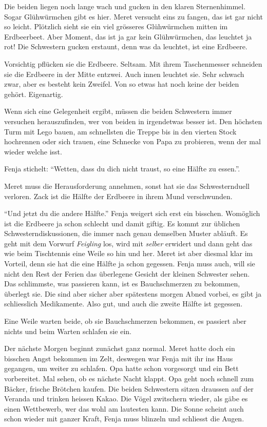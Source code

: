 Die beiden liegen noch lange wach und gucken in den klaren Sternenhimmel. Sogar Glühwürmchen gibt es hier. Meret versucht eins zu fangen, das ist gar nicht so leicht. Plötzlich sieht sie ein viel grösseres Glühwürmchen mitten im Erdbeerbeet. Aber Moment, das ist ja gar kein Glühwürmchen, das leuchtet ja rot! Die Schwestern gucken erstaunt, denn was da leuchtet, ist eine Erdbeere.

Vorsichtig pflücken sie die Erdbeere. Seltsam. Mit ihrem Taschenmesser schneiden sie die Erdbeere in der Mitte entzwei. Auch innen leuchtet sie. Sehr schwach zwar, aber es besteht kein Zweifel. Von so etwas hat noch keine der beiden gehört. Eigenartig. 

Wenn sich eine Gelegenheit ergibt, müssen die beiden Schwestern immer versuchen herauszufinden, wer von beiden in irgendetwas besser ist. Den höchsten Turm mit Lego bauen, am schnellsten die Treppe bis in den vierten Stock hochrennen oder sich trauen, eine Schnecke von Papa zu probieren, wenn der mal wieder welche isst. 

Fenja stichelt: \enquote{Wetten, dass du dich nicht traust, so eine Hälfte zu essen.}. 

Meret muss die Herausforderung annehmen, sonst hat sie das Schwesternduell verloren. Zack ist die Hälfte der Erdbeere in ihrem Mund verschwunden.

\enquote{Und jetzt du die andere Hälfte.} Fenja weigert sich erst ein bisschen. Womöglich ist die Erdbeere ja schon schlecht und damit giftig. Es kommt zur üblichen Schwesterndiskussionen, die immer nach genau demselben Muster abläuft. Es geht mit dem Vorwurf \textit{Feigling} los, wird mit \textit{selber} erwidert und dann geht das wie beim Tischtennis eine Weile so hin und her. Meret ist aber diesmal klar im Vorteil, denn sie hat die eine Hälfte ja schon gegessen. Fenja muss auch, will sie nicht den Rest der Ferien das überlegene Gesicht der kleinen Schwester sehen. Das schlimmste, was passieren kann, ist es Bauchschmerzen zu bekommen, überlegt sie. Die sind aber sicher aber spätestens morgen Abned vorbei, es gibt ja schliesslich Medikamente. Also gut, und auch die zweite Hälfte ist gegessen.

Eine Weile warten beide, ob sie Bauchschmerzen bekommen, es passiert aber nichts und beim Warten schlafen sie ein.

\begin{center}
    {\color{red}\aldineleft}
\end{center}

Der nächste Morgen beginnt zunächst ganz normal. Meret hatte doch ein bisschen Angst bekommen im Zelt, deswegen war Fenja mit ihr ins Haus gegangen, um weiter zu schlafen. Opa hatte schon vorgesorgt und ein Bett vorbereitet. Mal sehen, ob es nächste Nacht klappt. Opa geht noch schnell zum Bäcker, frische Brötchen kaufen. Die beiden Schwestern sitzen draussen auf der Veranda und trinken heissen Kakao. Die Vögel zwitschern wieder, als gäbe es einen Wettbewerb, wer das wohl am lautesten kann. Die Sonne scheint auch schon wieder mit ganzer Kraft, Fenja muss blinzeln und schliesst die Augen.


